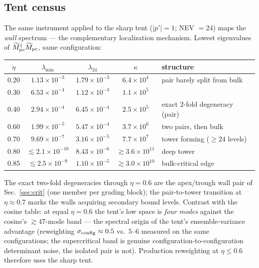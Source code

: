 \documentclass[11pt]{article}
\newcommand{\Mt}{\widetilde{M}}
\begin{document}
\subsection{Tent census}
\label{sec:tentcensus}
The same instrument applied to the sharp tent ($|p'| = 1$; NEV $= 24$)
maps the \emph{wall} spectrum --- the complementary localization
mechanism.  Lowest eigenvalues of
$\Mt_{\rm pc}^\dagger\Mt_{\rm pc}$, same configuration:

\begin{center}
\begin{tabular}{ccccl}
\toprule
$\eta$ & $\lambda_{\min}$ & $\lambda_{24}$ & $\kappa$ & structure \\
\midrule
0.20 & $1.13\times10^{-3}$ & $1.79\times10^{-3}$ & $6.4\times10^{4}$ & pair barely split from bulk \\
0.30 & $6.53\times10^{-4}$ & $1.12\times10^{-3}$ & $1.1\times10^{5}$ & \\
0.40 & $2.94\times10^{-4}$ & $6.45\times10^{-4}$ & $2.5\times10^{5}$ & exact 2-fold degeneracy (pair) \\
0.60 & $1.99\times10^{-5}$ & $5.47\times10^{-4}$ & $3.7\times10^{6}$ & two pairs, then bulk \\
0.70 & $9.69\times10^{-7}$ & $3.16\times10^{-5}$ & $7.7\times10^{7}$ & tower forming ($\ge24$ levels) \\
0.80 & $\lesssim2.1\times10^{-10}$ & $8.43\times10^{-6}$ & $\gtrsim3.6\times10^{11}$ & deep tower \\
0.85 & $\lesssim2.5\times10^{-9}$ & $1.10\times10^{-5}$ & $\gtrsim3.0\times10^{10}$ & bulk-critical edge \\
\bottomrule
\end{tabular}
\end{center}

The exact two-fold degeneracies through $\eta = 0.6$ are the
apex/trough wall pair of Sec.~\ref{sec:crit} (one member per grading
block); the pair-to-tower transition at $\eta \approx 0.7$ marks the
walls acquiring secondary bound levels.  Contrast with the cosine
table: at equal $\eta = 0.6$ the tent's low space is
\emph{four modes} against the cosine's $\gtrsim 47$-mode band ---
the spectral origin of the tent's ensemble-variance advantage
(reweighting $\sigma_{\rm config} \approx 0.5$ vs.\ $5$--$6$ measured
on the same configurations; the supercritical band is genuine
configuration-to-configuration determinant noise, the isolated pair is
not).  Production reweighting at $\eta \le 0.6$ therefore uses the
sharp tent.
\end{document}
